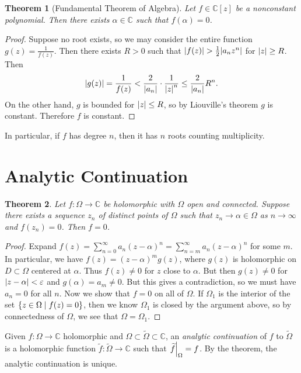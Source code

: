\documentclass[leqno, openany]{memoir}
\newtheorem{thm}{Theorem}[section]
\theoremstyle{definition}
\theoremstyle{remark}
\theoremstyle{plain}
\theoremstyle{definition}
\theoremstyle{remark}
\newcommand{\C}{\mathbb{C}}
\newcommand{\ep}{\varepsilon}
\newcommand{\wt}[1]{\widetilde{#1}}
\begin{document}
\begin{thm}[Fundamental Theorem of Algebra]
    Let $f \in \C[z]$ be a nonconstant polynomial. Then there exists $\alpha \in \C$ such that $f(\alpha) = 0$.
\end{thm}

\begin{proof}
    Suppose no root exists, so we may consider the entire function $g(z) = \frac{1}{f(z)}$. Then there exists $R > 0$ such that $\abs{f(z)} > \frac{1}{2} \abs{a_n z^n}$ for $\abs{z} \geq R$. Then
    \[ \abs{g(z)} = \frac{1}{f(z)} < \frac{2}{\abs{a_n}} \cdot \frac{1}{\abs{z}^n} \leq \frac{2}{\abs{a_n}} R^n. \]
    On the other hand, $g$ is bounded for $\abs{z} \leq R$, so by Liouville's theorem $g$ is constant. Therefore $f$ is constant.
\end{proof}

In particular, if $f$ has degree $n$, then it has $n$ roots counting multiplicity.

\section{Analytic Continuation}%
\label{sec:analytic_continuation}

\begin{thm}
    Let $f \colon \Omega \to \C$ be holomorphic with $\Omega$ open and connected. Suppose there exists a sequence $z_n$ of distinct points of $\Omega$ such that $z_n \to \alpha \in \Omega$ as $n \to \infty$ and $f(z_n) = 0$. Then $f = 0$.
\end{thm}

\begin{proof}
    Expand $f(z) = \sum_{n=0}^{\infty} a_n {(z-\alpha)}^n = \sum_{n=m}^{\infty} a_n {(z-\alpha)}^n$ for some $m$. In particular, we have $f(z) = {(z-\alpha)}^m g(z)$, where $g(z)$ is holomorphic on $D \subset \Omega$ centered at $\alpha$. Thus $f(z) \neq 0$ for $z$ close to $\alpha$. But then $g(z) \neq 0$ for $\abs{z-\alpha} < \ep$ and $g(\alpha) = a_m \neq 0$. But this gives a contradiction, so we must have $a_n = 0$ for all $n$. Now we show that $f = 0$ on all of $\Omega$. If $\Omega_1$ is the interior of the set $\qty{z \in \Omega \mid f(z) = 0}$, then we know $\Omega_1$ is closed by the argument above, so by connectedness of $\Omega$, we see that $\Omega = \Omega_1$.
\end{proof}

Given $f \colon \Omega \to \C$ holomorphic and $\Omega \subset \wt{\Omega} \subset \C$, an \textit{analytic continuation} of $f$ to $\wt{\Omega}$ is a holomorphic function $\wt{f} \colon \wt{\Omega} \to \C$ such that $\eval{\wt{f}}_{\Omega} = f$. By the theorem, the analytic continuation is unique.
\end{document}
